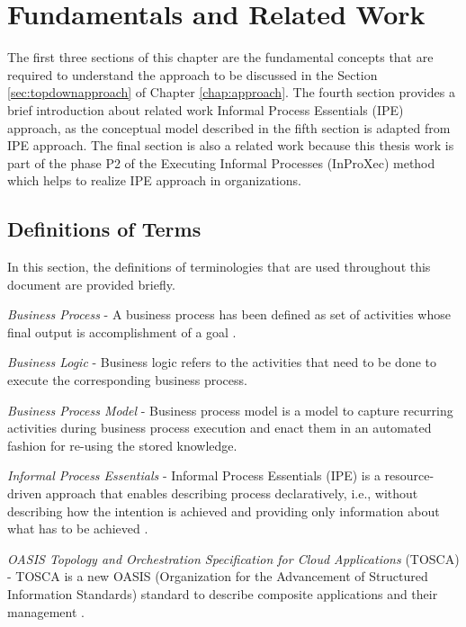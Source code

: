 \chapter{Fundamentals and Related Work}
\label{chap:fundamentals}
The first three sections of this chapter are the fundamental concepts that are required to understand the approach to be discussed in the Section \ref{sec:topdownapproach} of Chapter \ref{chap:approach}. The fourth section provides a brief introduction about related work Informal Process Essentials (IPE) approach, as the conceptual model described in the fifth section is adapted from IPE approach. The final section is also a related work because this thesis work is part of the phase P2 of the Executing Informal Processes (InProXec) method which helps to realize IPE approach in organizations.

\section{Definitions of Terms}
\label{sec:termdefinitions}
In this section, the definitions of terminologies that are used throughout this document are provided briefly.

\textit{Business Process} -  A business process has been defined as set of activities whose final output is accomplishment of a goal \cite{Weske2012}.  

\textit{Business Logic} - Business logic refers to the activities that need to be done to execute the corresponding business process. 

\textit{Business Process Model} - Business process model is a model to capture recurring activities during business process execution and enact them in an automated fashion for re-using the stored knowledge. 

\textit{Informal Process Essentials} - Informal Process Essentials (IPE) is a resource-driven approach that enables describing process declaratively, i.e., without describing how the intention is achieved and providing only information about what has to be achieved \cite{Sungur2014a}. 

\textit{OASIS Topology and Orchestration Specification for Cloud Applications} (TOSCA) - TOSCA  is  a  new  OASIS (Organization for the Advancement of Structured Information Standards) standard to describe composite applications and their management \cite{Kopp2013}.  

